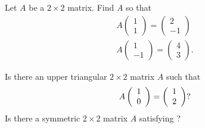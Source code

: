 \documentclass{ximera}
\begin{document}
\begin{exercise} \label{c4.1.8}
Let $A$ be a $2\times 2$ matrix.  Find $A$ so that
\begin{eqnarray*}
A\left(\begin{array}{r} 1 \\ 1 \end{array}\right) =
\left(\begin{array}{r} 2 \\ -1 \end{array}\right) \\
A\left(\begin{array}{r} 1 \\ -1 \end{array}\right) =
\left(\begin{array}{r} 4 \\ 3 \end{array}\right).
\end{eqnarray*}
\end{exercise}

\begin{exercise} \label{c4.1.9}
Is there an upper triangular $2\times 2$ matrix $A$ such that
\begin{equation}  \label{eq:avect}
A\left(\begin{array}{r} 1 \\ 0\end{array}\right) = \left(\begin{array}{r} 1 \\ 2\end{array}\right)?
\end{equation}
Is there a symmetric $2\times 2$ matrix $A$ satisfying ?
\end{exercise}

\CEXER
\end{document}

